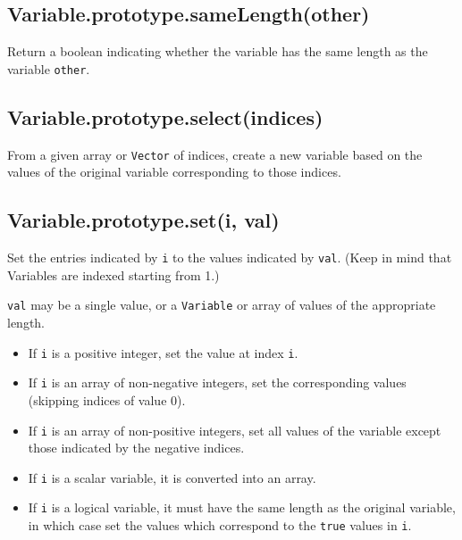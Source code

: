 \documentclass{article}
\begin{document}
    \subsection*{Variable.prototype.sameLength(other)}
    Return a boolean indicating whether the variable has the same length
as the variable \texttt{other}.


    \subsection*{Variable.prototype.select(indices)}
    From a given array or \texttt{Vector} of indices, create a new variable based on the
values of the original variable corresponding to those indices.


    \subsection*{Variable.prototype.set(i, val)}
    Set the entries indicated by \texttt{i} to the values indicated by \texttt{val}.
(Keep in mind that Variables are indexed starting from 1.)


\texttt{val} may be a single value, or a \texttt{Variable} or array of values of
the appropriate length.


\begin{itemize}

\item If \texttt{i} is a positive integer, set the value at index \texttt{i}.

\item If \texttt{i} is an array of non-negative integers, set
the corresponding values (skipping indices of value 0).

\item If \texttt{i} is an array of non-positive integers, set
all values of the variable except those indicated by the negative indices.

\item If \texttt{i} is a scalar variable, it is converted into an array.

\item If \texttt{i} is a logical variable, it must have the same length as the original
variable, in which case set the values which correspond to the \texttt{true}
values in \texttt{i}.

\end{itemize}
\end{document}
